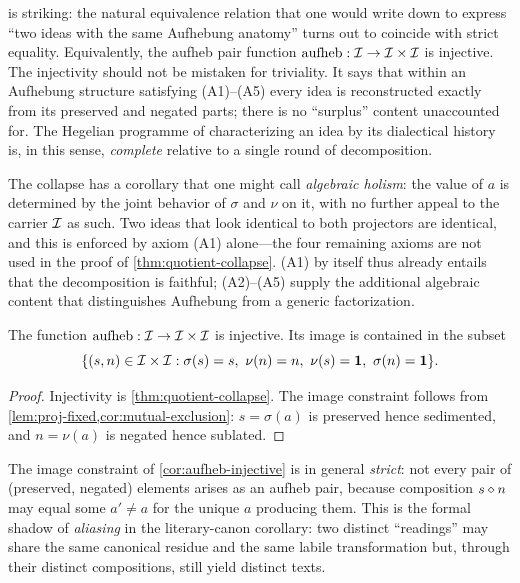  is striking: the natural equivalence
relation that one would write down to express ``two ideas with the
same Aufhebung anatomy'' turns out to coincide with strict equality.
Equivalently, the aufheb pair function
$\mathrm{aufheb}:\mathcal{I}\to\mathcal{I}\times\mathcal{I}$ is injective. The injectivity
should not be mistaken for triviality. It says that within an
Aufhebung structure satisfying (A1)--(A5) every idea is reconstructed
exactly from its preserved and negated parts; there is no
``surplus'' content unaccounted for. The Hegelian programme of
characterizing an idea by its dialectical history is, in this sense,
\emph{complete} relative to a single round of decomposition.

The collapse has a corollary that one might call \emph{algebraic
holism}: the value of $a$ is determined by the joint behavior of
$\sigma$ and $\nu$ on it, with no further appeal to the carrier
$\mathcal{I}$ as such. Two ideas that look identical to both projectors
are identical, and this is enforced by axiom (A1) alone---the four
remaining axioms are not used in the proof of
\cref{thm:quotient-collapse}. (A1) by itself thus already entails
that the decomposition is faithful; (A2)--(A5) supply the additional
algebraic content that distinguishes Aufhebung from a generic
factorization.

\begin{corollary}\label{cor:aufheb-injective}
The function $\mathrm{aufheb}:\mathcal{I}\to\mathcal{I}\times\mathcal{I}$ is injective. Its
image is contained in the subset
\[
\{(s,n)\in\Ideas\times\Ideas : \sigma(s)=s,\ \nu(n)=n,\
\nu(s)=\unit,\ \sigma(n)=\unit\}.
\]
\end{corollary}

\begin{proof}
Injectivity is \cref{thm:quotient-collapse}. The image constraint
follows from \cref{lem:proj-fixed,cor:mutual-exclusion}: $s=\sigma(a)$
is preserved hence sedimented, and $n=\nu(a)$ is negated hence
sublated.
\end{proof}

\begin{remark}
The image constraint of \cref{cor:aufheb-injective} is in general
\emph{strict}: not every pair of (preserved, negated) elements arises
as an aufheb pair, because composition $s\mathbin{\diamond} n$ may equal some
$a'\neq a$ for the unique $a$ producing them. This is the formal
shadow of \emph{aliasing} in the literary-canon corollary: two
distinct ``readings'' may share the same canonical residue and the
same labile transformation but, through their distinct compositions,
still yield distinct texts.
\end{remark}

